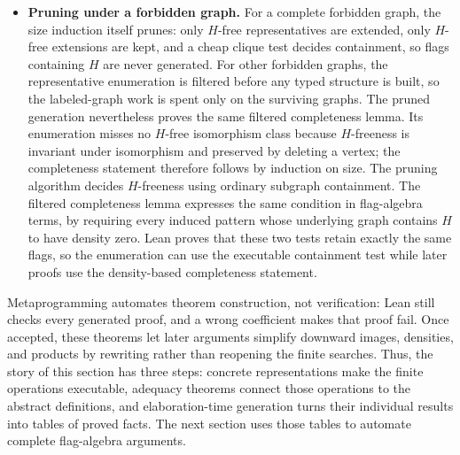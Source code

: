 \documentclass{article}
\newcommand{\lean}[1]{\texttt{#1}}
\begin{document}
\begin{itemize}
\item \textbf{Pruning under a forbidden graph.}
For a complete forbidden graph, the size induction itself prunes: only
\(H\)-free representatives are extended, only \(H\)-free extensions are kept,
and a cheap clique test decides containment, so flags containing \(H\) are
never generated.  For other forbidden graphs, the representative enumeration
is filtered before any typed structure is built, so the labeled-graph work is
spent only on the surviving graphs.  The pruned generation nevertheless
proves the same filtered completeness lemma.  Its enumeration misses no
\(H\)-free isomorphism class because \(H\)-freeness is invariant under
isomorphism and preserved by deleting a vertex; the completeness statement
therefore follows by induction on size.  The pruning algorithm
decides \(H\)-freeness using ordinary subgraph containment.  The filtered
completeness lemma expresses the same condition in flag-algebra terms, by
requiring every induced pattern whose underlying graph contains \(H\) to have
density zero.  Lean proves that these two tests retain exactly the same flags,
so the enumeration can use the executable containment test while later proofs
use the density-based completeness statement.


\end{itemize}

Metaprogramming automates theorem construction, not verification: Lean still
checks every generated proof, and a wrong coefficient makes that proof fail.
Once accepted, these theorems let later arguments simplify downward images,
densities, and products by rewriting rather than reopening the finite searches.
Thus, the story of this section has three steps: concrete representations make
the finite operations executable, adequacy theorems connect those operations
to the abstract definitions, and elaboration-time generation turns their
individual results into tables of proved facts.  The next section
uses those tables to automate complete flag-algebra arguments.
\end{document}
